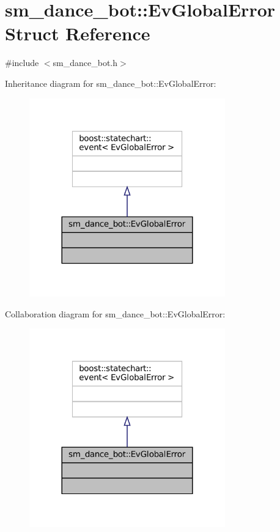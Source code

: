 \hypertarget{structsm__dance__bot_1_1EvGlobalError}{}\section{sm\+\_\+dance\+\_\+bot\+:\+:Ev\+Global\+Error Struct Reference}
\label{structsm__dance__bot_1_1EvGlobalError}


{\ttfamily \#include $<$sm\+\_\+dance\+\_\+bot.\+h$>$}



Inheritance diagram for sm\+\_\+dance\+\_\+bot\+:\+:Ev\+Global\+Error\+:
\nopagebreak
\begin{figure}[H]
\begin{center}
\leavevmode
\includegraphics[width=240pt]{structsm__dance__bot_1_1EvGlobalError__inherit__graph}
\end{center}
\end{figure}


Collaboration diagram for sm\+\_\+dance\+\_\+bot\+:\+:Ev\+Global\+Error\+:
\nopagebreak
\begin{figure}[H]
\begin{center}
\leavevmode
\includegraphics[width=240pt]{structsm__dance__bot_1_1EvGlobalError__coll__graph}
\end{center}
\end{figure}


